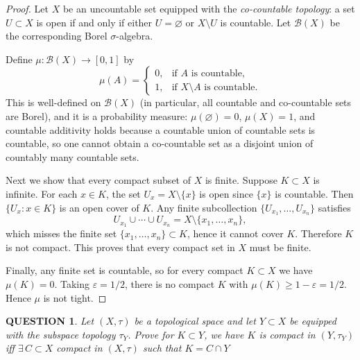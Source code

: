 \documentclass[12pt]{article}
\renewcommand{\(}{\left(}%
\renewcommand{\)}{\right)}%
\renewcommand{\[}{\left[}%
\renewcommand{\]}{\right]}%
\newtheorem{question}{QUESTION}[section]}
\newtheorem{proof}{Proof.}}
\begin{document}
\begin{proof}
Let $X$ be an uncountable set equipped with the \emph{co-countable topology}:
a set $U\subset X$ is open if and only if either $U=\varnothing$ or $X\setminus U$ is countable.
Let $\mathcal{B}(X)$ be the corresponding Borel $\sigma$-algebra.

Define $\mu:\mathcal{B}(X)\to[0,1]$ by
\begin{equation*}
\mu(A)=
\begin{cases}
0, & \text{if $A$ is countable},\\
1, & \text{if $X\setminus A$ is countable}.
\end{cases}
\end{equation*}
This is well-defined on $\mathcal{B}(X)$ (in particular, all countable and co-countable sets are Borel), and it is a probability measure: $\mu(\varnothing)=0$, $\mu(X)=1$, and countable additivity holds because a countable union of countable sets is countable, so one cannot obtain a co-countable set as a disjoint union of countably many countable sets.

Next we show that every compact subset of $X$ is finite. Suppose $K\subset X$ is infinite. For each $x\in K$, the set $U_x=X\setminus\{x\}$ is open since $\{x\}$ is countable. Then $\{U_x:x\in K\}$ is an open cover of $K$. Any finite subcollection $\{U_{x_1},\dots,U_{x_n}\}$ satisfies
\begin{equation*}
U_{x_1}\cup\cdots\cup U_{x_n}=X\setminus\{x_1,\dots,x_n\},
\end{equation*}
which misses the finite set $\{x_1,\dots,x_n\}\subset K$, hence it cannot cover $K$. Therefore $K$ is not compact. This proves that every compact set in $X$ must be finite.

Finally, any finite set is countable, so for every compact $K\subset X$ we have $\mu(K)=0$. Taking $\varepsilon=1/2$, there is no compact $K$ with $\mu(K)\ge 1-\varepsilon=1/2$. Hence $\mu$ is not tight.
\end{proof}

\begin{question}
Let $(X,\tau)$ be a topological space and let $Y\subset X$ be equipped with the subspace topology $\tau_Y$. 
Prove for $K\subset Y$, we have $K$ is compact in $(Y,\tau_Y)$ iff $\exists\, C\subset X$ compact in $(X,\tau)$ such that $ K=C\cap Y$
\end{question}
\end{document}
